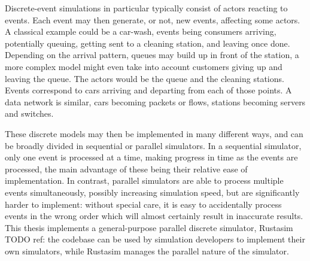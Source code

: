 Discrete-event simulations in particular typically consist of actors reacting to events.
Each event may then generate, or not, new events, affecting some actors.
A classical example could be a car-wash, events being consumers arriving, potentially queuing, getting sent to a cleaning station, and leaving once done.
Depending on the arrival pattern, queues may build up in front of the station, a more complex model might even take into account customers giving up and leaving the queue. %
The actors would be the queue and the cleaning stations.
Events correspond to cars arriving and departing from each of those points.
A data network is similar, cars becoming packets or flows, stations becoming servers and switches.

These discrete models may then be implemented in many different ways, and can be broadly divided in sequential or parallel simulators.
In a sequential simulator, only one event is processed at a time, making progress in time as the events are processed, the main advantage of these being their relative ease of implementation.
In contrast, parallel simulators are able to process multiple events simultaneously, possibly increasing simulation speed, but are significantly harder to implement: without special care, it is easy to accidentally process events in the wrong order which will almost certainly result in inaccurate results.
This thesis implements a general-purpose parallel discrete simulator, Rustasim TODO ref: the codebase can be used by simulation developers to implement their own simulators, while Rustasim manages the parallel nature of the simulator.
